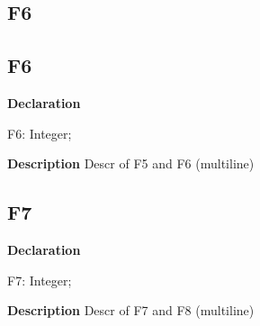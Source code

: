\documentclass{report}
\newif\ifpdf
\begin{document}
\subsection*{\large{\textbf{F6}}\normalsize\hspace{1ex}\hrulefill}
\else
\subsection*{F6}
\fi
\label{ok_multiple_fields-F6}
\begin{list}{}{
\setlength{\itemindent}{0cm}
\setlength{\listparindent}{0cm}
\setlength{\leftmargin}{\evensidemargin}
\addtolength{\leftmargin}{\tmplength}
\settowidth{\labelsep}{X}
\addtolength{\leftmargin}{\labelsep}
\setlength{\labelwidth}{\tmplength}
}
\item[\textbf{Declaration}\hfill]
\ifpdf
\begin{flushleft}
\fi
\begin{ttfamily}
F6: Integer;\end{ttfamily}

\ifpdf
\end{flushleft}
\fi

\par
\item[\textbf{Description}]
Descr of F5 and F6 (multiline)

\end{list}
\ifpdf
\subsection*{\large{\textbf{F7}}\normalsize\hspace{1ex}\hrulefill}
\else
\subsection*{F7}
\fi
\label{ok_multiple_fields-F7}
\begin{list}{}{
\setlength{\itemindent}{0cm}
\setlength{\listparindent}{0cm}
\setlength{\leftmargin}{\evensidemargin}
\addtolength{\leftmargin}{\tmplength}
\settowidth{\labelsep}{X}
\addtolength{\leftmargin}{\labelsep}
\setlength{\labelwidth}{\tmplength}
}
\item[\textbf{Declaration}\hfill]
\ifpdf
\begin{flushleft}
\fi
\begin{ttfamily}
F7: Integer;\end{ttfamily}

\ifpdf
\end{flushleft}
\fi

\par
\item[\textbf{Description}]
Descr of F7 and F8 (multiline)

\end{list}
\ifpdf
\end{document}
